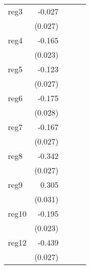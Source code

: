 {\begin{longtable}{l*{4}{D{.}{.}{-1}}}
\addlinespace
reg3        &      -0.027         &                     &                     &                     \\
            &     (0.027)         &                     &                     &                     \\
\addlinespace
reg4        &      -0.165\sym{***}&                     &                     &                     \\
            &     (0.023)         &                     &                     &                     \\
\addlinespace
reg5        &      -0.123\sym{***}&                     &                     &                     \\
            &     (0.027)         &                     &                     &                     \\
\addlinespace
reg6        &      -0.175\sym{***}&                     &                     &                     \\
            &     (0.028)         &                     &                     &                     \\
\addlinespace
reg7        &      -0.167\sym{***}&                     &                     &                     \\
            &     (0.027)         &                     &                     &                     \\
\addlinespace
reg8        &      -0.342\sym{***}&                     &                     &                     \\
            &     (0.027)         &                     &                     &                     \\
\addlinespace
reg9        &       0.305\sym{***}&                     &                     &                     \\
            &     (0.031)         &                     &                     &                     \\
\addlinespace
reg10       &      -0.195\sym{***}&                     &                     &                     \\
            &     (0.023)         &                     &                     &                     \\
\addlinespace
reg12       &      -0.439\sym{***}&                     &                     &                     \\
            &     (0.027)         &                     &                     &                     \\

\end{longtable}}
